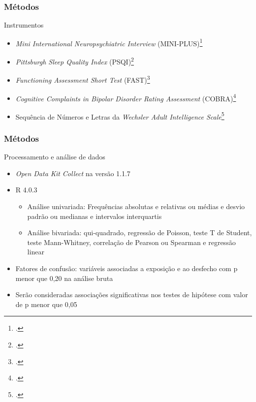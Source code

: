 \documentclass{beamer}
\begin{document}
\begin{frame}
\frametitle{Métodos}

    \begin{block}{Instrumentos}
        \begin{itemize}
            \item \emph{Mini International Neuropsychiatric Interview} (MINI-PLUS)\footcite{amorim_mini_2000}
            \item \emph{Pittsburgh Sleep Quality Index} (PSQI)\footcite{bertolazi_validation_2011}
            \item \emph{Functioning Assessment Short Test} (FAST)\footcite{cacilhas_validity_2009}
            \item \emph{Cognitive Complaints in Bipolar Disorder Rating Assessment} (COBRA)\footcite{lima_validity_2018}
            \item Sequência de Números e Letras da \emph{Wechsler Adult Intelligence Scale}\footcite{wechsler_wais_2004}
        \end{itemize}
    \end{block}

\end{frame}

\begin{frame}
\frametitle{Métodos}

    \begin{block}{Processamento e análise de dados}
        \begin{itemize}
            \item \emph{Open Data Kit Collect} na versão 1.1.7       
            \item R 4.0.3
            \begin{itemize}
                \item Análise univariada: Frequências absolutas e relativas ou
                médias e desvio padrão ou medianas e intervalos interquartis
                \item Análise bivariada: qui-quadrado, regressão de Poisson,
                teste T de Student, teste Mann-Whitney, correlação de Pearson
                ou Spearman e regressão linear
            \end{itemize}
            \item Fatores de confusão: variáveis associadas a exposição e ao
            desfecho com p menor que 0,20 na análise bruta
            \item Serão consideradas associações significativas nos testes de
            hipótese com valor de p menor que 0,05
        \end{itemize}
    \end{block}

\end{frame}
\end{document}
